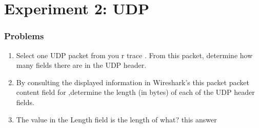 \section{Experiment 2: UDP}
    \subsubsection*{Problems}
    \begin{enumerate}[label=\bfseries Problem \arabic*:,leftmargin=*,labelindent=1em]
        \item Select one UDP packet from you r trace . From this packet, determine how many fields there are in the UDP header.\\[0.2mm]
        \soln
        \item By consulting the displayed information in Wireshark’s this packet packet content field for ,determine the length (in bytes) of each of the UDP header fields.\\[0.2mm]
        \soln
        \item The value in the Length field is the length of what? this answer\\[0.2mm]
        \soln

\end{enumerate}
